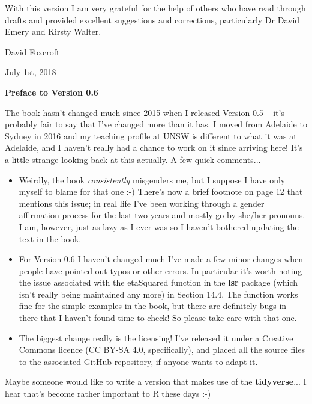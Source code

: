 With this version I am very grateful for the help of others who have read through drafts and provided excellent suggestions and corrections, particularly Dr David Emery and Kirsty Walter.

\vspace*{24pt}
\noindent
David Foxcroft 

\noindent
July 1st, 2018

\vspace*{35pt}


\begin{center}{\Large {\bf Preface to Version 0.6}}\end{center}
\vspace*{12pt}

\noindent
The book hasn't changed much since 2015 when I released Version 0.5 -- it's probably fair to say that I've changed more than it has. I moved from Adelaide to Sydney in 2016 and my teaching profile at UNSW is different to what it was at Adelaide, and I haven't really had a chance to work on it since arriving here! It's a little strange looking back at this actually. A few quick comments...

\begin{itemize}
\item Weirdly, the book {\it consistently} misgenders me, but I suppose I have only myself to blame for that one :-) There's now a brief footnote on page 12 that mentions this issue; in real life I've been working through a gender affirmation process for the last two years and mostly go by she/her pronouns. I am, however, just as lazy as I ever was so I haven't bothered updating the text in the book.  
\item For Version 0.6 I haven't changed much I've made a few minor changes when people have pointed out typos or other errors. In particular it's worth noting the issue associated with the etaSquared function in the {\bf lsr} package (which isn't really being maintained any more) in Section 14.4. The function works fine for the simple examples in the book, but there are definitely bugs in there that I haven't found time to check! So please take care with that one. 
\item The biggest change really is the licensing! I've released it under a Creative Commons licence (CC BY-SA 4.0, specifically), and placed all the source files to the associated GitHub repository, if anyone wants to adapt it.
\end{itemize} 

\noindent
Maybe someone would like to write a version that makes use of the {\bf tidyverse}... I hear that's become rather important to R these days :-)

